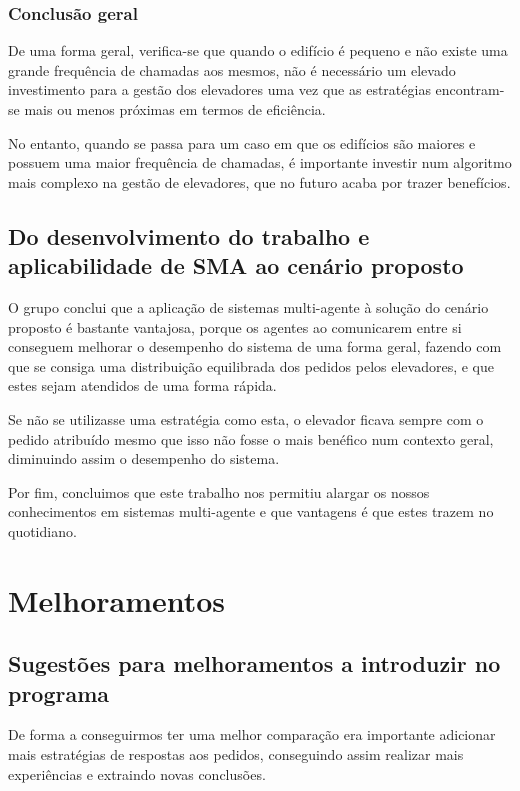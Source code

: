 ﻿\documentclass[a4paper]{article}
\begin{document}
\subsubsection{Conclusão geral}

De uma forma geral, verifica-se que quando o edifício é pequeno e não existe uma grande frequência de chamadas aos mesmos, não é necessário um elevado investimento para a gestão dos elevadores uma vez que as estratégias encontram-se mais ou menos próximas em termos de eficiência.

No entanto, quando se passa para um caso em que os edifícios são maiores e possuem uma maior frequência de chamadas, é importante investir num algoritmo mais complexo na gestão de elevadores, que no futuro acaba por trazer benefícios.

\subsection{Do desenvolvimento do trabalho e aplicabilidade de SMA ao cenário proposto}

O grupo conclui que a aplicação de sistemas multi-agente à solução do cenário proposto é bastante vantajosa, porque os agentes ao comunicarem entre si conseguem melhorar o desempenho do sistema de uma forma geral, fazendo com que se consiga uma distribuição equilibrada dos pedidos pelos elevadores, e que estes sejam atendidos de uma forma rápida.

Se não se utilizasse uma estratégia como esta, o elevador ficava sempre com o pedido atribuído mesmo que isso não fosse o mais benéfico num contexto geral, diminuindo assim o desempenho do sistema. 

Por fim, concluimos que este trabalho nos permitiu alargar os nossos conhecimentos em sistemas multi-agente e que vantagens é que estes trazem no quotidiano.

\newpage

\section{Melhoramentos}

\subsection{Sugestões para melhoramentos a introduzir no programa}

De forma a conseguirmos ter uma melhor comparação era importante adicionar mais estratégias de respostas aos pedidos, conseguindo assim realizar mais experiências e extraindo novas conclusões.
\end{document}
